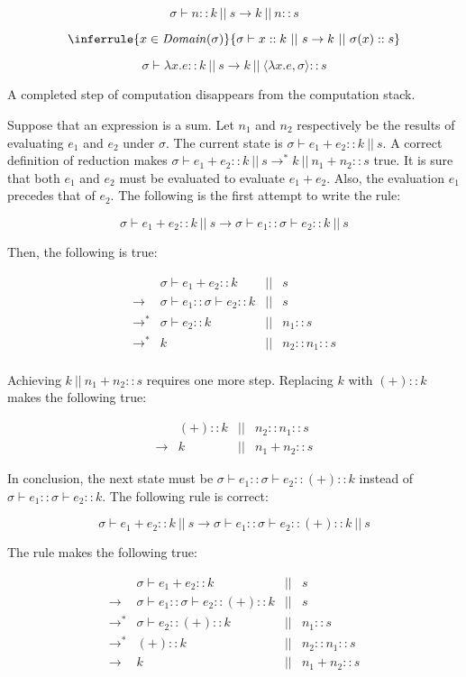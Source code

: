 \[\sigma\vdash n::k\ ||\ s\rightarrow k\ ||\ n::s\]

\[
\inferrule
{ x\in\mathit{Domain}(\sigma) }
{ \sigma\vdash x::k\ ||\ s\rightarrow k\ ||\ \sigma(x)::s }
\]

\[\sigma\vdash \lambda x.e::k\ ||\ s\rightarrow k\ ||\ \langle\lambda
x.e,\sigma\rangle ::s\]

A completed step of computation disappears from the computation stack.

Suppose that an expression is a sum. Let $n_1$ and $n_2$ respectively be the
results of evaluating $e_1$ and $e_2$ under $\sigma$. The current state is
$\sigma\vdash e_1+e_2::k\ ||\ s$. A correct definition of reduction makes
$\sigma\vdash e_1+e_2::k\ ||\ s\rightarrow^\ast k\ ||\ n_1+n_2::s$ true. It is
sure that both $e_1$ and $e_2$ must be evaluated to evaluate $e_1+e_2$. Also, the
evaluation $e_1$ precedes that of $e_2$. The following is the first attempt to
write the rule:

\[\sigma\vdash e_1+e_2::k\ ||\ s\rightarrow \sigma\vdash e_1::\sigma\vdash
e_2::k\ ||\ s\]

Then, the following is true:

\[
\begin{array}{lrcr}
& \sigma\vdash e_1+e_2::k & || & s \\
\rightarrow & \sigma\vdash e_1::\sigma\vdash e_2::k & || & s \\
\rightarrow^\ast & \sigma\vdash e_2::k & || & n_1::s \\
\rightarrow^\ast & k & || & n_2::n_1::s \\
\end{array}
\]

Achieving $k\ ||\ n_1+n_2::s$ requires one more step. Replacing $k$ with $(+)::k$
makes the following true:

\[
\begin{array}{lrcr}
& (+)::k & || & n_2::n_1::s \\
\rightarrow & k & || & n_1+n_2::s
\end{array}
\]

In conclusion, the next state must be $\sigma\vdash e_1::\sigma\vdash e_2::
(+)::k$ instead of $\sigma\vdash e_1::\sigma\vdash e_2::k$. The following rule is
correct:

\[\sigma\vdash e_1+e_2::k\ ||\ s\rightarrow \sigma\vdash e_1::\sigma\vdash
e_2::(+)::k\ ||\ s\]

The rule makes the following true:

\[
\begin{array}{lrcr}
& \sigma\vdash e_1+e_2::k & || & s \\
\rightarrow & \sigma\vdash e_1::\sigma\vdash e_2::(+)::k & || & s \\
\rightarrow^\ast & \sigma\vdash e_2::(+)::k & || & n_1::s \\
\rightarrow^\ast & (+)::k & || & n_2::n_1::s \\
\rightarrow & k & || & n_1+n_2::s
\end{array}
\]


